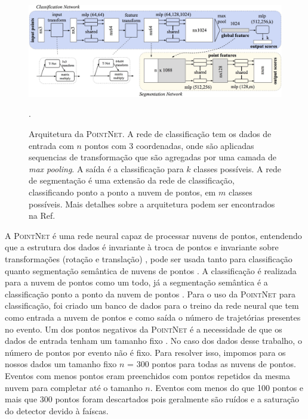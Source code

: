 \documentclass[a4paper,12pt,oneside]{book}
\begin{document}
\begin{figure}[H]
    \centering
    \includegraphics[scale = 0.22]{figs/pointnet_arch.png}
    \caption{Arquitetura da \textsc{PointNet}. A rede de classificação tem os dados de entrada com $n$ pontos com 3 coordenadas, onde são aplicadas sequencias de transformação que são agregadas por uma camada de \textit{max pooling}. A saída é a classificação para $k$ classes possíveis. A rede de segmentação é uma extensão da rede de classificação, classificando ponto a ponto a nuvem de pontos, em $m$ classes possíveis. Mais detalhes sobre a arquitetura podem ser encontrados na Ref. \cite{qi2016pointnet}}.
    \label{fig:aqr:pointnet}
\end{figure}

\par A \textsc{PointNet} é uma rede neural capaz de processar nuvens de pontos, entendendo que a estrutura dos dados é invariante à troca de pontos e invariante sobre transformações (rotação e translação) \cite{RF_pc}, pode ser usada tanto para classificação quanto segmentação semântica de nuvens de pontos \cite{qi2016pointnet}. A classificação é realizada para a nuvem de pontos como um todo, já a segmentação semântica é a classificação ponto a ponto da nuvem de pontos \cite{qi2016pointnet}. Para o uso da \textsc{PointNet} para classificação, foi criado um banco de dados para o treino da rede neural que tem como entrada a nuvem de pontos e como saída o número de trajetórias presentes no evento. Um dos pontos negativos da \textsc{PointNet} é a necessidade de que os dados de entrada tenham um tamanho fixo \cite{qi2016pointnet}. No caso dos dados desse trabalho, o número de pontos por evento não é  fixo. Para resolver isso, impomos para os nossos dados um tamanho fixo $n$ = 300 pontos para todas as nuvens de pontos. Eventos com menos pontos eram preenchidos com pontos repetidos da mesma nuvem para completar até o tamanho $n$. Eventos com menos do que 100 pontos e mais que 300 pontos foram descartados pois geralmente são ruídos e a saturação do detector devido à faíscas.
\end{document}
